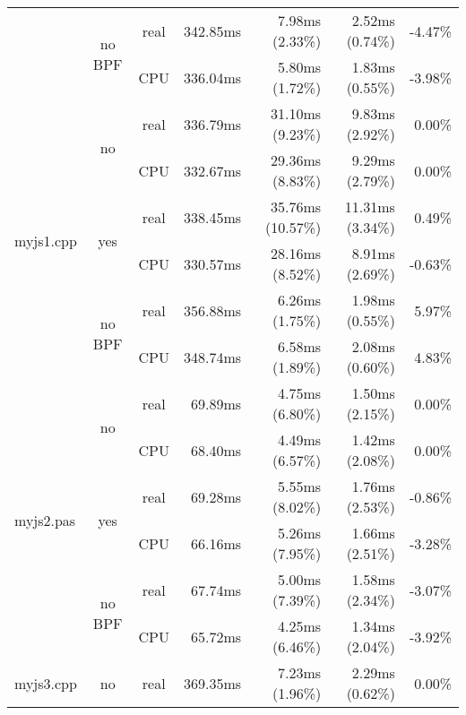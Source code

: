 \documentclass[en]{pracamgr}
\begin{document}
\begin{small}
\begin{longtable}{|l|c|c|r|r|r|r|}
                            \cline{2-7}
                            & \multirow{2}{*}{no BPF} & real & 342.85ms & 7.98ms (2.33\%) & 2.52ms (0.74\%) & -4.47\% \\*
                            &                         & CPU  & 336.04ms & 5.80ms (1.72\%) & 1.83ms (0.55\%) & -3.98\% \\
\hline
\multirow{6}{*}{myjs1.cpp}  & \multirow{2}{*}{no}     & real & 336.79ms & 31.10ms (9.23\%) & 9.83ms (2.92\%) & 0.00\% \\*
                            &                         & CPU  & 332.67ms & 29.36ms (8.83\%) & 9.29ms (2.79\%) & 0.00\% \\*
                            \cline{2-7}
                            & \multirow{2}{*}{yes}    & real & 338.45ms & 35.76ms (10.57\%) & 11.31ms (3.34\%) & 0.49\% \\*
                            &                         & CPU  & 330.57ms & 28.16ms (8.52\%) & 8.91ms (2.69\%) & -0.63\% \\*
                            \cline{2-7}
                            & \multirow{2}{*}{no BPF} & real & 356.88ms & 6.26ms (1.75\%) & 1.98ms (0.55\%) & 5.97\% \\*
                            &                         & CPU  & 348.74ms & 6.58ms (1.89\%) & 2.08ms (0.60\%) & 4.83\% \\
\hline
\multirow{6}{*}{myjs2.pas}  & \multirow{2}{*}{no}     & real & 69.89ms & 4.75ms (6.80\%) & 1.50ms (2.15\%) & 0.00\% \\*
                            &                         & CPU  & 68.40ms & 4.49ms (6.57\%) & 1.42ms (2.08\%) & 0.00\% \\*
                            \cline{2-7}
                            & \multirow{2}{*}{yes}    & real & 69.28ms & 5.55ms (8.02\%) & 1.76ms (2.53\%) & -0.86\% \\*
                            &                         & CPU  & 66.16ms & 5.26ms (7.95\%) & 1.66ms (2.51\%) & -3.28\% \\*
                            \cline{2-7}
                            & \multirow{2}{*}{no BPF} & real & 67.74ms & 5.00ms (7.39\%) & 1.58ms (2.34\%) & -3.07\% \\*
                            &                         & CPU  & 65.72ms & 4.25ms (6.46\%) & 1.34ms (2.04\%) & -3.92\% \\
\hline
\multirow{6}{*}{myjs3.cpp}  & \multirow{2}{*}{no}     & real & 369.35ms & 7.23ms (1.96\%) & 2.29ms (0.62\%) & 0.00\% \\*

\end{longtable}
\end{small}
\end{document}
